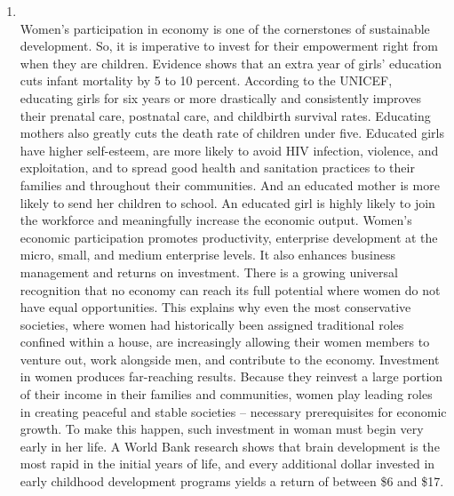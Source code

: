\documentclass[12pt]{article}
\begin{document}
\begin{enumerate}
      To counter this silent crisis, it is imperative to rethink priorities and take collective action. Transitioning from fossil fuels to renewable energy sources like solar, wind and hydropower can significantly reduce emissions. Better waste management practices, such as recycling, composting, and reducing plastic dependency, can alleviate the pressure on landfills and waterways. Governments must enforce stricter environmental regulations, while industries should adopt sustainable practices, such as green technologies and cleaner production methods. Public awareness campaigns play a crucial role in fostering eco-friendly habits, encouraging individuals to embrace small changes, like using public transport, conserving water, or planting trees that collectively make a significant difference. By embedding sustainability into lifestyles and decision-making processes, society can mitigate the long-term effects of pollution, ensuring a cleaner, healthier, and more resilient environment for generations to come.
      
    \item {}\\
      Women's participation in economy is one of the cornerstones of sustainable development. So, it is imperative to invest for their empowerment right from when they are children. Evidence shows that an extra year of girls' education cuts infant mortality by 5 to 10 percent. According to the UNICEF, educating girls for six years or more drastically and consistently improves their prenatal care, postnatal care, and childbirth survival rates. Educating mothers also greatly cuts the death rate of children under five. Educated girls have higher self-esteem, are more likely to avoid HIV infection, violence, and exploitation, and to spread good health and sanitation practices to their families and throughout their communities. And an educated mother is more likely to send her children to school. An educated girl is highly likely to join the workforce and meaningfully increase the economic output. Women’s economic participation promotes productivity, enterprise development at the micro, small, and medium enterprise levels. It also enhances business management and returns on investment. There is a growing universal recognition that no economy can reach its full potential where women do not have equal opportunities. This explains why even the most conservative societies, where women had historically been assigned traditional roles confined within a house, are increasingly allowing their women members to venture out, work alongside men, and contribute to the economy. Investment in women produces far-reaching results. Because they reinvest a large portion of their income in their families and communities, women play leading roles in creating peaceful and stable societies – necessary prerequisites for economic growth. To make this happen, such investment in woman must begin very early in her life. A World Bank research shows that brain development is the most rapid in the initial years of life, and every additional dollar invested in early childhood development programs yields a return of between \$6 and \$17.


\end{enumerate}
\end{document}
